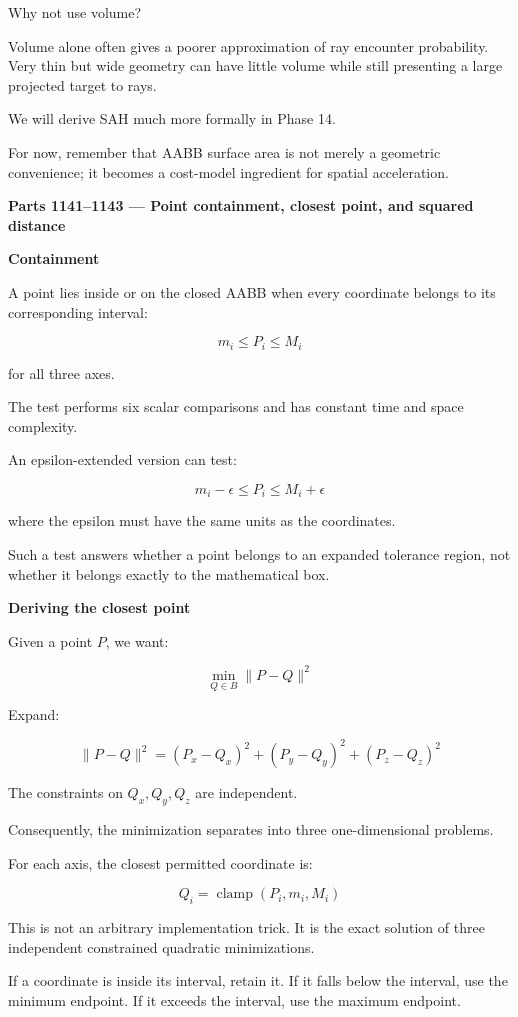 Why not use volume?

Volume alone often gives a poorer approximation of ray encounter probability. Very thin but wide geometry can have little volume while still presenting a large projected target to rays.

We will derive SAH much more formally in Phase 14.

For now, remember that AABB surface area is not merely a geometric convenience; it becomes a cost-model ingredient for spatial acceleration.

\textbf{Parts 1141--1143 --- Point containment, closest point, and squared distance}

\textbf{Containment}

A point lies inside or on the closed AABB when every coordinate belongs to its corresponding interval:

\[
\boxed{ m_i\le P_i\le M_i }
\]

for all three axes.

The test performs six scalar comparisons and has constant time and space complexity.

An epsilon-extended version can test:

\[
m_i-\epsilon\le P_i\le M_i+\epsilon
\]

where the epsilon must have the same units as the coordinates.

Such a test answers whether a point belongs to an expanded tolerance region, not whether it belongs exactly to the mathematical box.

\textbf{Deriving the closest point}

Given a point \(P\), we want:

\[
\min_{Q\in B}\|P-Q\|^2
\]

Expand:

\[
\|P-Q\|^2= (P_x-Q_x)^2+ (P_y-Q_y)^2+ (P_z-Q_z)^2
\]

The constraints on \(Q_x,Q_y,Q_z\) are independent.

Consequently, the minimization separates into three one-dimensional problems.

For each axis, the closest permitted coordinate is:

\[
\boxed{ Q_i=\operatorname{clamp}(P_i,m_i,M_i) }
\]

This is not an arbitrary implementation trick. It is the exact solution of three independent constrained quadratic minimizations.

If a coordinate is inside its interval, retain it. If it falls below the interval, use the minimum endpoint. If it exceeds the interval, use the maximum endpoint.

